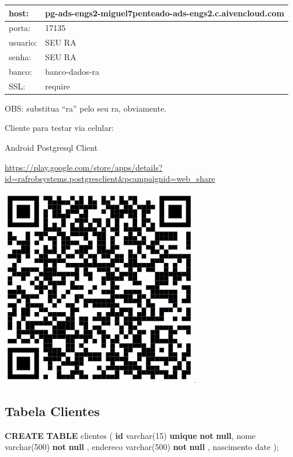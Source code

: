 \documentclass[
]{book}
\newenvironment{Shaded}{\begin{snugshade}}{\end{snugshade}}
\newcommand{\DataTypeTok}[1]{\textcolor[rgb]{0.13,0.29,0.53}{#1}}
\newcommand{\DecValTok}[1]{\textcolor[rgb]{0.00,0.00,0.81}{#1}}
\newcommand{\KeywordTok}[1]{\textcolor[rgb]{0.13,0.29,0.53}{\textbf{#1}}}
\newcommand{\NormalTok}[1]{#1}
\begin{document}
\begin{longtable}[]{@{}ll@{}}
\toprule\noalign{}
host: & pg-ads-engs2-miguel7penteado-ads-engs2.c.aivencloud.com \\
\midrule\noalign{}
\endhead
\bottomrule\noalign{}
\endlastfoot
porta: & 17135 \\
usuario: & SEU RA \\
senha: & SEU RA \\
banco: & banco-dados-ra \\
SSL: & require \\
\end{longtable}

OBS: substitua ``ra'' pelo seu ra, obviamente.

Cliente para testar via celular:

Android Postgresql Client

\url{https://play.google.com/store/apps/details?id=rafrobsystems.postgresclient&pcampaignid=web_share}

\includegraphics{images/clipboard-78059825.png}

\subsection{Tabela Clientes}\label{tabela-clientes-1}

\begin{Shaded}
\begin{Highlighting}[]
\KeywordTok{CREATE} \KeywordTok{TABLE}\NormalTok{ clientes}
\NormalTok{(}
\KeywordTok{id}         \DataTypeTok{varchar}\NormalTok{(}\DecValTok{15}\NormalTok{) }\KeywordTok{unique} \KeywordTok{not} \KeywordTok{null}\NormalTok{,}
\NormalTok{nome       }\DataTypeTok{varchar}\NormalTok{(}\DecValTok{500}\NormalTok{) }\KeywordTok{not} \KeywordTok{null}\NormalTok{ ,}
\NormalTok{endereco   }\DataTypeTok{varchar}\NormalTok{(}\DecValTok{500}\NormalTok{) }\KeywordTok{not} \KeywordTok{null}\NormalTok{ ,}
\NormalTok{nascimento }\DataTypeTok{date}
\NormalTok{);}
\end{Highlighting}
\end{Shaded}
\end{document}
